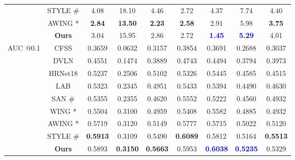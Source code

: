 \documentclass[runningheads]{llncs}
\begin{document}
\begin{table*}[t]
{\begin{tabular}{ccccccccc}
& STYLE \cite{qian2019aggregation} \# & 4.08 & 18.10 & 4.46 & 2.72 & 4.37 & 7.74 & 4.40 \\
                & AWING \cite{wang2019adaptive} * & \textbf{2.84} & \textbf{13.50} & \textbf{2.23} & \textbf{2.58} & 2.91 & 5.98 & \textbf{3.75} \\
                & \textbf{Ours} & 3.04 & 15.95 & 2.86 & 2.72 & \textcolor{blue}{\textbf{1.45}} & \textcolor{blue}{\textbf{5.29}} & {4.01} \\
        \midrule
            \multirow{8}{*}{{AUC @0.1}}
                & CFSS \cite{zhu2015face} & 0.3659 & 0.0632 & 0.3157 & 0.3854 & 0.3691 & 0.2688 & 0.3037 \\
                & DVLN \cite{wu2017leveraging} & 0.4551 & 0.1474 & 0.3889 & 0.4743 & 0.4494 & 0.3794 & 0.3973 \\
                & HRNet18 \cite{sun2019deep} & 0.5237 & 0.2506 & 0.5102 & 0.5326 & 0.5445 & 0.4585 & 0.4515 \\
                & LAB \cite{wu2018look} & 0.5323 & 0.2345 & 0.4951 & 0.5433 & 0.5394 & 0.4490 & 0.4630 \\
                & SAN \cite{dong2018style} \# & 0.5355 & 0.2355 & 0.4620 & 0.5552 & 0.5222 & 0.4560 & 0.4932 \\
                & WING \cite{feng2018wing} * & 0.5504 & 0.3100 & 0.4959 & 0.5408 & 0.5582 & 0.4885 & 0.4932 \\
& AWING \cite{wang2019adaptive} * & 0.5719 & 0.3120 & 0.5149 & 0.5777 & 0.5715 & 0.5022 & 0.5120 \\
                & STYLE \cite{qian2019aggregation} \# & \textbf{0.5913} & 0.3109 & 0.5490 & \textbf{0.6089} & 0.5812 & 0.5164 & \textbf{0.5513} \\
                & \textbf{Ours} & 0.5893 & \textbf{0.3150} & \textbf{0.5663} & 0.5953 & \textcolor{blue}{\textbf{0.6038}} & \textcolor{blue}{\textbf{0.5235}} & 0.5329 \\
        \bottomrule
      \end{tabular}
  }
\label{tab:wflw}
\end{table*}
\end{document}
